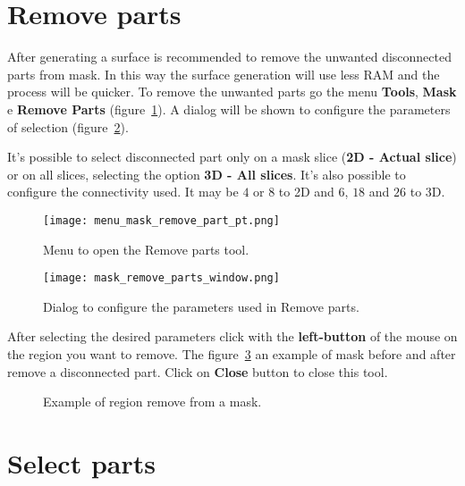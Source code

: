 \section{Remove parts}

After generating a surface is recommended to remove the unwanted disconnected parts from mask. In this way the surface generation will use less RAM and the process will be quicker.  To remove the unwanted parts go the menu  \textbf{Tools}, \textbf{Mask} e \textbf{Remove Parts} (figure~\ref{fig:menu_mask_remove_part}). A dialog will be shown to configure the parameters of selection (figure~\ref{fig:mask_remove_parts_window}).

It's possible to select disconnected part only on a mask slice (\textbf{2D - Actual slice}) or on all slices, selecting the option \textbf{3D - All slices}. It's also possible to configure the connectivity used. It may be $4$ or $8$ to 2D and $6$, $18$ and $26$ to 3D.

\begin{figure}[!htb]
\centering
\texttt{[image: menu\_mask\_remove\_part\_pt.png]}
\caption{Menu to open the Remove parts tool.}
\label{fig:menu_mask_remove_part}
\end{figure}

\begin{figure}[!htb]
\centering
\texttt{[image: mask\_remove\_parts\_window.png]}
\caption{Dialog to configure the parameters used in Remove parts.}
\label{fig:mask_remove_parts_window}
\end{figure}

After selecting the desired parameters click with the \textbf{left-button} of the mouse on the region you want to remove. The figure~\ref{fig:mask_removed_part} an example of mask before and after remove a disconnected part. Click on \textbf{Close} button to close this tool.

\begin{figure}[!htb]
  \centering
    \qquad
  \hfill
  \caption{Example of region remove from a mask.}
  \label{fig:mask_removed_part}
\end{figure}

\section{Select parts}

